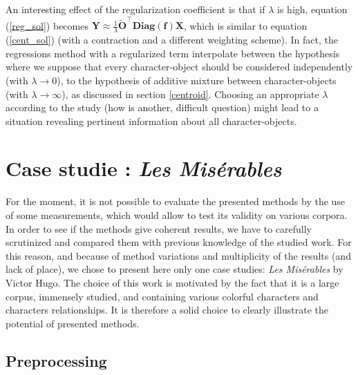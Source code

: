 \documentclass[
twocolumn,
]{ceurart}
\begin{document}
An interesting effect of the regularization coefficient is that if $\lambda$ is high, equation (\ref{reg_sol}) becomes $\mathbf{Y} \approx \frac{1}{\lambda} \widetilde{\mathbf{O}}^\top \textbf{Diag}(\mathbf{f}) \mathbf{X}$, which is similar to equation (\ref{cent_sol}) (with a contraction and a different weighting scheme). In fact, the regressions method with a regularized term interpolate between the hypothesis where we suppose that every character-object should be considered independently (with $\lambda \to 0$), to the hypothesis of additive mixture between character-objects (with $\lambda \to \infty$), as discussed in section \ref{centroid}. Choosing an appropriate $\lambda$ according to the study (how is another, difficult question) might lead to a situation revealing pertinent information about all character-objects.

\section{Case studie : \emph{Les Misérables}}
\label{case_studie}

For the moment, it is not possible to evaluate the presented methods by the use of some measurements, which would allow to test its validity on various corpora. In order to see if the methods give coherent results, we have to carefully scrutinized and compared them with previous knowledge of the studied work. For this reason, and because of method variations and multiplicity of the results (and lack of place), we chose to present here only one case studies: \emph{Les Misérables} by Victor Hugo. The choice of this work is motivated by the fact that it is a large corpus, immensely studied, and containing various colorful characters and characters relationships. It is therefore a solid choice to clearly illustrate the potential of presented methods.

\subsection{Preprocessing}
\end{document}
